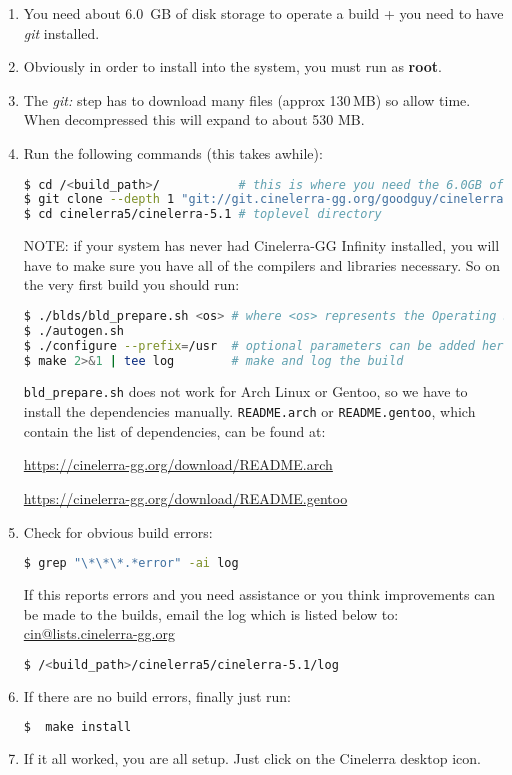 \begin{enumerate}
    \item 
        You need about 6.0 \,GB of disk storage to operate a build + you need to have \textit{git} installed.
    \item  Obviously in order to install into the system, you must run as \textbf{root}.
    \item  The \textit{git:} step has to download many files (approx 130\,MB) so allow time.  When decompressed this will expand to about 530 MB.
    \item  Run the following commands (this takes awhile):

        \begin{lstlisting}[language=bash,numbers=none]
$ cd /<build_path>/           # this is where you need the 6.0GB of disk space
$ git clone --depth 1 "git://git.cinelerra-gg.org/goodguy/cinelerra.git" cinelerra5 
$ cd cinelerra5/cinelerra-5.1 # toplevel directory
        \end{lstlisting}

        NOTE: if your system has never had Cinelerra-GG Infinity installed, you will have to make sure you have all of the compilers and libraries necessary.  
        So on the very first build you should run:

        \begin{lstlisting}[language=bash,numbers=none]
$ ./blds/bld_prepare.sh <os> # where <os> represents the Operating System of centos, fedora, suse, ubuntu, mint, debian.
$ ./autogen.sh
$ ./configure --prefix=/usr  # optional parameters can be added here
$ make 2>&1 | tee log        # make and log the build
        \end{lstlisting}
        \texttt{bld\_prepare.sh} does not work for Arch Linux or Gentoo, so we have to install the dependencies manually. \texttt{README.arch} or \texttt{README.gentoo}, which contain the list of dependencies, can be found at: \\ 
{\small \url{https://cinelerra-gg.org/download/README.arch}

	\url{https://cinelerra-gg.org/download/README.gentoo}}
    \item  Check for obvious build errors:
        \begin{lstlisting}[language=bash,numbers=none]
$ grep "\*\*\*.*error" -ai log
        \end{lstlisting}
        If this reports errors and you need assistance or you think improvements can be made to the builds,
        email the log which is listed below to: \href{mailto:cin@lists.cinelerra-gg.org}{cin@lists.cinelerra-gg.org}
        \begin{lstlisting}[language=bash,numbers=none]
$ /<build_path>/cinelerra5/cinelerra-5.1/log
        \end{lstlisting}
    \item  If there are no build errors, finally just run:
        \begin{lstlisting}[language=bash,numbers=none]
   $  make install
        \end{lstlisting}
    \item  If it all worked, you are all setup. Just click on the Cinelerra desktop icon.
\end{enumerate}

